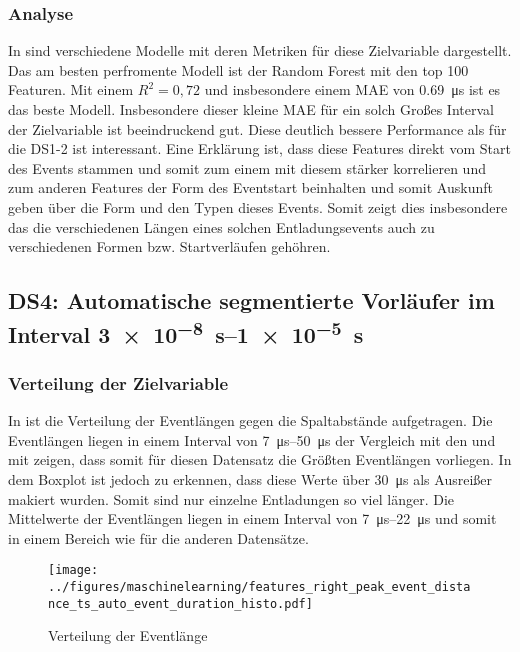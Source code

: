 \subsubsection{Analyse}
In  sind verschiedene Modelle mit deren Metriken für diese Zielvariable dargestellt. Das am besten perfromente Modell ist der Random Forest mit den top 100 Featuren. Mit einem \(R^2 = 0,72\) und insbesondere einem MAE von \SI{0,69}{\micro\second} ist es das beste Modell. Insbesondere dieser kleine MAE für ein solch Großes Interval der Zielvariable ist beeindruckend gut. Diese deutlich bessere Performance als für die DS1-2 ist interessant. Eine Erklärung ist, dass diese Features direkt vom Start des Events stammen und somit zum einem mit diesem stärker korrelieren und zum anderen Features der Form des Eventstart beinhalten und somit Auskunft geben über die Form und den Typen dieses Events. Somit zeigt dies insbesondere das die verschiedenen Längen eines solchen Entladungsevents auch zu verschiedenen Formen bzw. Startverläufen gehöhren.



\subsection{DS4: Automatische segmentierte Vorläufer im Interval \SIrange{3e-8}{1e-5}{\second}}

\subsubsection{Verteilung der Zielvariable}

In  ist die Verteilung der Eventlängen gegen die Spaltabstände aufgetragen. Die Eventlängen liegen in einem Interval von \SIrange{7}{50}{\micro\second} der Vergleich mit den  und mit  zeigen, dass somit für diesen Datensatz die Größten Eventlängen vorliegen. In dem Boxplot ist jedoch zu erkennen, dass diese Werte über \SI{30}{\micro\second} als Ausreißer makiert wurden. Somit sind nur einzelne Entladungen so viel länger. Die Mittelwerte der Eventlängen liegen in einem Interval von \SIrange{7}{22}{\micro\second} und somit in einem Bereich wie für die anderen Datensätze. 
\begin{figure}[H]
    \centering
      \texttt{[image: ../figures/maschinelearning/features\_right\_peak\_event\_distance\_ts\_auto\_event\_duration\_histo.pdf]}
      \caption{Verteilung der Eventlänge}
      \label{fig:event_right_event_duration_box}
\end{figure}


